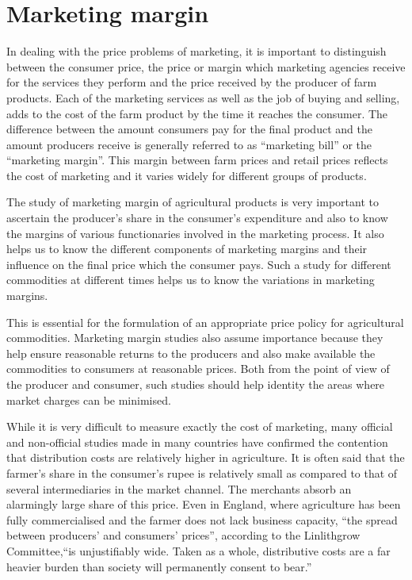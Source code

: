 \documentclass[11pt,]{book}
\theoremstyle{definition}
\theoremstyle{definition}
\theoremstyle{definition}
\theoremstyle{remark}
\begin{document}
\section{Marketing margin}\label{marketing-margin}

In dealing with the price problems of marketing, it is important to
distinguish between the consumer price, the price or margin which
marketing agencies receive for the services they perform and the price
received by the producer of farm products. Each of the marketing
services as well as the job of buying and selling, adds to the cost of
the farm product by the time it reaches the consumer. The difference
between the amount consumers pay for the final product and the amount
producers receive is generally referred to as ``marketing bill'' or the
``marketing margin''. This margin between farm prices and retail prices
reflects the cost of marketing and it varies widely for different groups
of products.

The study of marketing margin of agricultural products is very important
to ascertain the producer's share in the consumer's expenditure and also
to know the margins of various functionaries involved in the marketing
process. It also helps us to know the different components of marketing
margins and their influence on the final price which the consumer pays.
Such a study for different commodities at different times helps us to
know the variations in marketing margins.

This is essential for the formulation of an appropriate price policy for
agricultural commodities. Marketing margin studies also assume
importance because they help ensure reasonable returns to the producers
and also make available the commodities to consumers at reasonable
prices. Both from the point of view of the producer and consumer, such
studies should help identity the areas where market charges can be
minimised.

While it is very difficult to measure exactly the cost of marketing,
many official and non-official studies made in many countries have
confirmed the contention that distribution costs are relatively higher
in agriculture. It is often said that the farmer's share in the
consumer's rupee is relatively small as compared to that of several
intermediaries in the market channel. The merchants absorb an alarmingly
large share of this price. Even in England, where agriculture has been
fully commercialised and the farmer does not lack business capacity,
``the spread between producers' and consumers' prices'', according to
the Linlithgrow Committee,``is unjustifiably wide. Taken as a whole,
distributive costs are a far heavier burden than society will
permanently consent to bear.''
\end{document}
